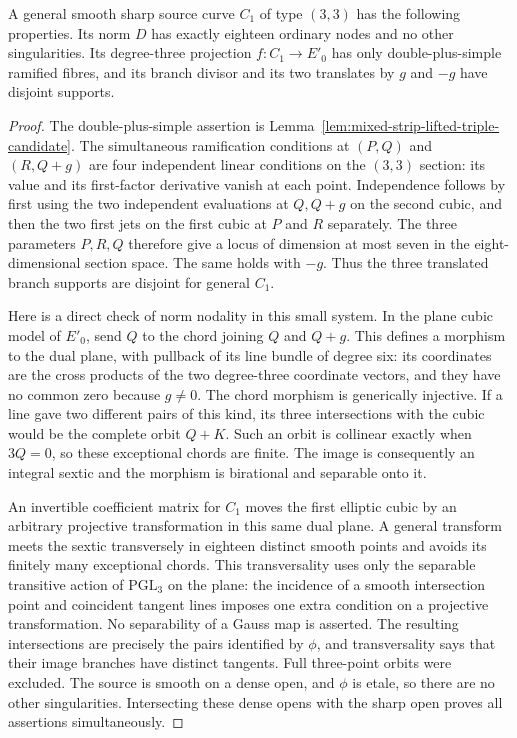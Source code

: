 \begin{lemma}
\label{lem:mixed-d3-cubic-norm-source-candidate}
A general smooth sharp source curve $C_1$ of type $(3,3)$ has
the following properties. Its norm $D$ has exactly eighteen
ordinary nodes and no other singularities. Its degree-three
projection $f:C_1\to E'_0$ has only double-plus-simple ramified
fibres, and its branch divisor and its two translates by $g$
and $-g$ have disjoint supports.
\end{lemma}
\begin{proof}
The double-plus-simple assertion is
Lemma~\ref{lem:mixed-strip-lifted-triple-candidate}.
The simultaneous ramification conditions at $(P,Q)$ and
$(R,Q+g)$ are four independent linear conditions on the
$(3,3)$ section: its value and its first-factor derivative
vanish at each point. Independence follows by first using the
two independent evaluations at $Q,Q+g$ on the second cubic,
and then the two first jets on the first cubic at $P$ and $R$
separately. The three parameters $P,R,Q$ therefore give a locus
of dimension at most seven in the eight-dimensional section
space. The same holds with $-g$. Thus the three translated
branch supports are disjoint for general $C_1$.

Here is a direct check of norm nodality in this small system.
In the plane cubic model of $E'_0$, send $Q$ to the chord
joining $Q$ and $Q+g$. This defines a morphism to the dual plane,
with pullback of its line bundle of degree six: its coordinates
are the cross products of the two degree-three coordinate vectors,
and they have no common zero because $g\ne0$.
The chord morphism is generically injective. If a line gave two
different pairs of this kind, its three intersections with the
cubic would be the complete orbit $Q+K$. Such an orbit is
collinear exactly when $3Q=0$, so these exceptional chords are
finite. The image is consequently an integral sextic and the
morphism is birational and separable onto it.

An invertible coefficient matrix for $C_1$ moves the first
elliptic cubic by an arbitrary projective transformation in
this same dual plane. A general transform meets the sextic
transversely in eighteen distinct smooth points and avoids its
finitely many exceptional chords. This transversality uses only
the separable transitive action of $\mathrm{PGL}_3$ on the plane:
the incidence of a smooth intersection point and coincident
tangent lines imposes one extra condition on a projective
transformation. No separability of a Gauss map is asserted.
The resulting intersections are precisely the pairs identified
by $\phi$, and transversality says that their image branches
have distinct tangents. Full three-point orbits were excluded.
The source is smooth on a dense open, and $\phi$ is etale, so
there are no other singularities. Intersecting these dense
opens with the sharp open proves all assertions simultaneously.
\end{proof}

